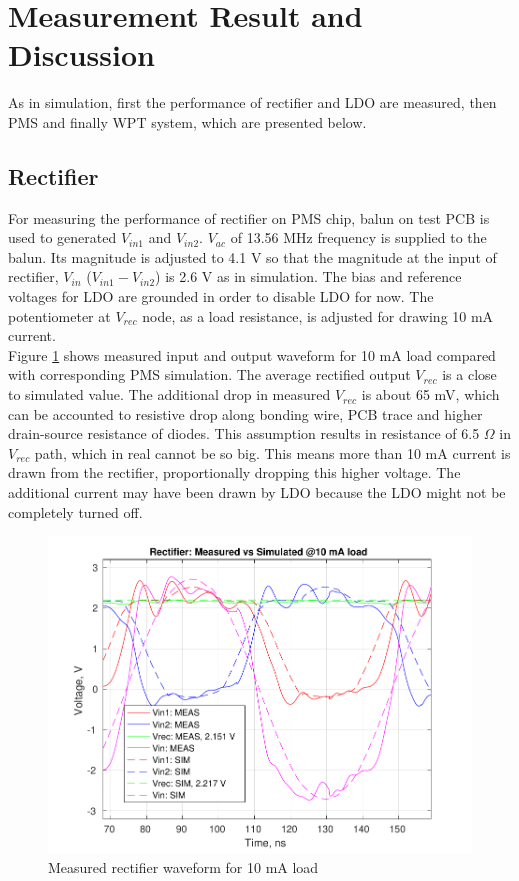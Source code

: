 \documentclass[12pt,a4paper,UKenglish]{report}
\begin{document}
\section{Measurement Result and Discussion} %
As in simulation, first the performance of rectifier and LDO are measured, then PMS and finally WPT system, which are 
presented below. 

\subsection{Rectifier} %
For measuring the performance of rectifier on PMS chip, balun on test PCB is used to generated $V_{in1}$ and $V_{in2}$.  $V_{ac}$ of 
13.56 MHz frequency is supplied to the balun. Its magnitude is adjusted to 4.1 V so that the magnitude at the input of rectifier, 
$V_{in}$ ($V_{in1} -V_{in2}$) is 2.6 V as in simulation. The bias and reference voltages for LDO are grounded in order 
to disable LDO for now. The potentiometer at $V_{rec}$ node, as a load resistance, is adjusted for drawing 10 mA current. \\

Figure \ref{fig:meas_rect_10ma} shows measured input and output waveform for 10 mA load compared with corresponding 
PMS simulation. The average rectified output $V_{rec}$ is a close to simulated value. The additional drop in measured $V_{rec}$ is about 65 mV,
 which can be accounted to resistive drop along bonding wire, PCB trace and higher drain-source resistance of diodes. This assumption results in resistance of 6.5  $\Omega$ in $V_{rec}$ path, which in real cannot be so big. This means more than 10 mA current is drawn from the rectifier, proportionally dropping this higher voltage. The additional current may have been drawn by LDO because the LDO might not be completely turned off. \\
 
\begin{figure} [H]
  \centering
  \includegraphics[width=\textwidth]{img/meas/rect_10ma.pdf} 
 \caption{Measured rectifier waveform for 10 mA load} 
\label{fig:meas_rect_10ma} 
\end{figure}
 
\end{document}
